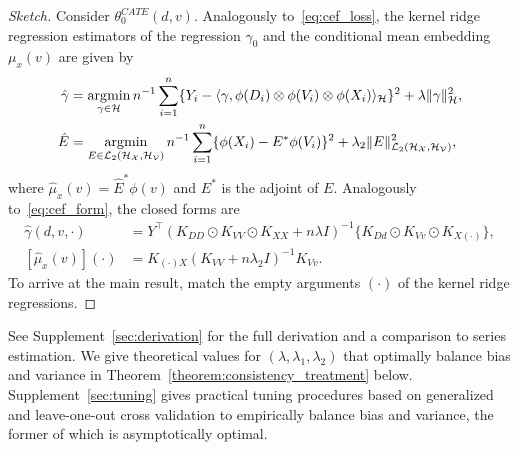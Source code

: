 \begin{proof}[Sketch]
Consider $\theta_0^{CATE}(d,v)$. Analogously to~\eqref{eq:cef_loss}, the kernel ridge regression estimators of the regression $\gamma_0$ and the conditional mean embedding $\mu_x(v)$ are given by
\begin{align*}
    \hat{\gamma}&=\operatorname*{\arg\!\min}_{\gamma \in\mathcal{H}} n^{-1}\sum_{i=1}^n \{Y_i-\langle\gamma, \phi(D_i)\otimes \phi(V_i) \otimes\phi (X_i)\rangle_{\mathcal{H}}\}^2 + \lambda \|\gamma\|^2_{\mathcal{H}}, \\
    \hat{E}&=\operatorname*{\arg\!\min}_{E\in\mathcal{L}_2(\mathcal{H}_{\mathcal{X}},\mathcal{H}_{\mathcal{V}})} n^{-1}\sum_{i=1}^n \{\phi(X_i)-E^*\phi(V_i)\}^2 + \lambda_2 \|E\|^2_{\mathcal{L}_2(\mathcal{H}_{\mathcal{X}},\mathcal{H}_{\mathcal{V}})},
\end{align*}
where $\hat{\mu}_x(v)=\hat{E}^*\phi(v)$ and $E^*$ is the adjoint of $E$.
Analogously to~\eqref{eq:cef_form}, the closed forms are
\begin{align*}
    \hat{\gamma}(d,v,\cdot)&=Y^{\top}(K_{DD}\odot K_{VV}\odot K_{XX}+n\lambda  I )^{-1}\{K_{Dd}\odot K_{Vv}\odot K_{X(\cdot)}\},\\
    [\hat{\mu}_x(v)](\cdot)&=K_{(\cdot) X}(K_{VV}+n\lambda_2  I )^{-1}K_{Vv}.
\end{align*}
To arrive at the main result, match the empty arguments $(\cdot)$ of the kernel ridge regressions.
\end{proof}
See Supplement~\ref{sec:derivation} for the full derivation and a comparison to series estimation. We give theoretical values for $(\lambda,\lambda_1,\lambda_2)$ that optimally balance bias and variance in Theorem~\ref{theorem:consistency_treatment} below. Supplement~\ref{sec:tuning} gives practical tuning procedures based on generalized and leave-one-out cross validation to empirically balance bias and variance, the former of which is asymptotically optimal. %

